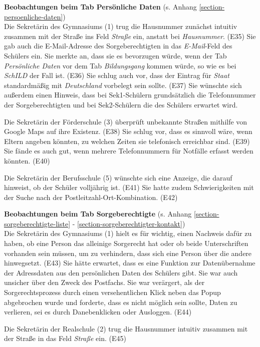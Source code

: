 \textbf{Beobachtungen beim Tab \glqq Persönliche Daten\grqq{}} (s. Anhang \ref{section-persoenliche-daten})\\
Die Sekretärin des Gymnasiums (1) trug die Hausnummer zunächst intuitiv zusammen mit der Straße ins Feld \textit{Straße} ein, anstatt bei \textit{Hausnummer}. (E35) Sie gab auch die E-Mail-Adresse des Sorgeberechtigten in das \textit{E-Mail}-Feld des Schülers ein. Sie merkte an, dass sie es bevorzugen würde, wenn der Tab \textit{Persönliche Daten} vor dem Tab \textit{Bildungsgang} kommen würde, so wie es bei \textit{SchILD}  der Fall ist. (E36) Sie schlug auch vor, dass der Eintrag für \textit{Staat} standardmäßig mit \textit{Deutschland} vorbelegt sein sollte. (E37) Sie wünschte sich außerdem einen Hinweis, dass bei Sek1-Schülern grundsätzlich die Telefonnummer der Sorgeberechtigten und bei Sek2-Schülern die des Schülers erwartet wird.

Die Sekretärin der Förderschule (3) überprüft unbekannte Straßen mithilfe von Google Maps auf ihre Existenz. (E38) Sie schlug vor, dass es sinnvoll wäre, wenn Eltern angeben könnten, zu welchen Zeiten sie telefonisch erreichbar sind. (E39) Sie fände es auch gut, wenn mehrere Telefonnummern für Notfälle erfasst werden könnten. (E40)

Die Sekretärin der Berufsschule (5) wünschte sich eine Anzeige, die darauf hinweist, ob der Schüler volljährig ist. (E41) Sie hatte zudem Schwierigkeiten mit der Suche nach der Postleitzahl-Ort-Kombination. (E42)

\textbf{Beobachtungen beim Tab \glqq Sorgeberechtigte\grqq{}} (s. Anhang \ref{section-sorgeberechtigte-liste} - \ref{section-sorgeberechtigter-kontakt})\\
Die Sekretärin des Gymnasiums (1) hielt es für wichtig, einen Nachweis dafür zu haben, ob eine Person das alleinige Sorgerecht hat oder ob beide Unterschriften vorhanden sein müssen, um zu verhindern, dass sich eine Person über die andere hinwegsetzt. (E43) Sie hätte erwartet, dass es eine Funktion zur Datenübernahme der Adressdaten aus den persönlichen Daten des Schülers gibt. Sie war auch unsicher über den Zweck des Postfachs. Sie war verärgert, als der Sorgerechtsprozess durch einen versehentlichen Klick neben das Popup abgebrochen wurde und forderte, dass es nicht möglich sein sollte, Daten zu verlieren, sei es durch Danebenklicken oder Ausloggen. (E44)

Die Sekretärin der Realschule (2) trug die Hausnummer intuitiv zusammen mit der Straße in das Feld \textit{Straße} ein. (E45)


